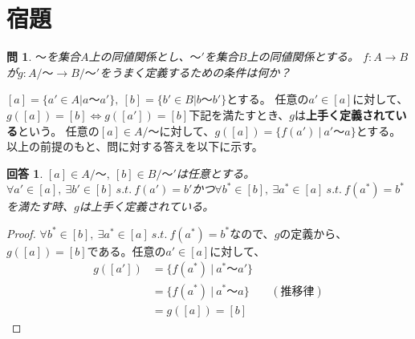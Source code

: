 \documentclass{jsarticle}
\newtheorem{Question}{問}
\newtheorem{Answer}{回答}
\newcommand{\2}{ {\bf 2} }
\begin{document}
    \section{宿題}
    \begin{Question}
        $〜$を集合$A$上の同値関係とし、$〜'$を集合$B$上の同値関係とする。
        $f:A \rightarrow B$が$g:A/〜 \rightarrow B/〜'$をうまく定義するための条件は何か？
    \end{Question}
    $[a]=\{a' \in A | a〜a'\},\ [b]=\{b' \in B | b〜b'\}$とする。
    任意の$a' \in [a]$に対して、$g([a])=[b] \Leftrightarrow g([a'])=[b]$下記を満たすとき、$g$は{\bf 上手く定義されている}という。
    任意の$[a] \in A/〜$に対して、$g([a])=\{f(a')\ |\ a' 〜 a \}$とする。
    以上の前提のもと、問に対する答えを以下に示す。
    \begin{Answer}
        $[a] \in A/ 〜,\ [b] \in B/〜'$は任意とする。\\
        $\forall a' \in [a],\ \exists b' \in [b]\ s.t.\ f(a')=b'$かつ$\forall b^* \in [b],\ \exists a^* \in [a]\ s.t.\ f(a^*)=b^*$を満たす時、$g$は上手く定義されている。
    \end{Answer}
    \begin{proof}
        $\forall b^* \in [b],\ \exists a^* \in [a]\ s.t.\ f(a^*)=b^*$なので、$g$の定義から、
        $g([a])=[b]$である。任意の$a'\in[a]$に対して、
        \begin{align*}
            g([a']) &= \{f(a^*)\ |\ a^* 〜 a'\} \\
            &=\{f(a^*)\ |\ a^*〜a\} &&(推移律)\\
            &=g([a])=[b]
        \end{align*}
    \end{proof}
\end{document}

